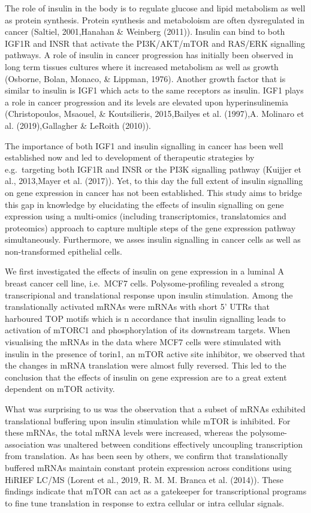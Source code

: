 \documentclass[12pt,openany]{book}
\begin{document}
The role of insulin in the body is to regulate glucose and lipid
metabolism as well as protein synthesis. Protein synthesis and
metaboloism are often dysregulated in cancer (Saltiel, 2001,Hanahan \&
Weinberg (2011)). Insulin can bind to both IGF1R and INSR that activate
the PI3K/AKT/mTOR and RAS/ERK signalling pathways. A role of insulin in
cancer progression has initially been observed in long term tissues
cultures where it increased metabolism as well as growth (Osborne,
Bolan, Monaco, \& Lippman, 1976). Another growth factor that is similar
to insulin is IGF1 which acts to the same receptors as insulin. IGF1
plays a role in cancer progression and its levels are elevated upon
hyperinsulinemia (Christopoulos, Msaouel, \& Koutsilieris, 2015,Bailyes
et al. (1997),A. Molinaro et al. (2019),Gallagher \& LeRoith (2010)).

The importance of both IGF1 and insulin signalling in cancer has been
well established now and led to development of therapeutic strategies by
e.g.~targeting both IGF1R and INSR or the PI3K signalling pathway
(Kuijjer et al., 2013,Mayer et al. (2017)). Yet, to this day the full
extent of insulin signalling on gene expression in cancer has not been
established. This study aims to bridge this gap in knowledge by
elucidating the effects of insulin signalling on gene expression using a
multi-omics (including transcriptomics, translatomics and proteomics)
approach to capture multiple steps of the gene expression pathway
simultaneously. Furthermore, we asses insulin signalling in cancer cells
as well as non-transformed epithelial cells.

We first investigated the effects of insulin on gene expression in a
luminal A breast cancer cell line, i.e.~MCF7 cells. Polysome-profiling
revealed a strong transcripional and translational response upon insulin
stimulation. Among the translationally activated mRNAs were mRNAs with
short 5' UTRs that harboured TOP motifs which is n accordance that
insulin signalling leads to activation of mTORC1 and phosphorylation of
its downstream targets. When visualising the mRNAs in the data where
MCF7 cells were stimulated with insulin in the presence of torin1, an
mTOR active site inhibitor, we observed that the changes in mRNA
translation were almost fully reversed. This led to the conclusion that
the effects of insulin on gene expression are to a great extent
dependent on mTOR activity.

What was surprising to us was the observation that a subset of mRNAs
exhibited translational buffering upon insulin stimulation while mTOR is
inhibited. For these mRNAs, the total mRNA levels were increased,
whereas the polysome-association was unaltered between conditions
effectively uncoupling transcription from translation. As has been seen
by others, we confirm that translationally buffered mRNAs maintain
constant protein expression across conditions using HiRIEF LC/MS (Lorent
et al., 2019, R. M. M. Branca et al. (2014)). These findings indicate
that mTOR can act as a gatekeeper for transcriptional programs to fine
tune translation in response to extra cellular or intra cellular
signals.
\end{document}
